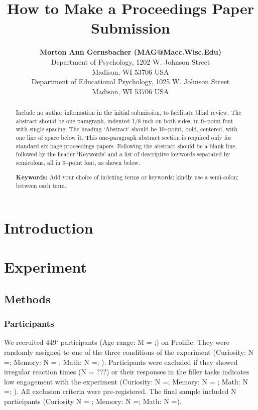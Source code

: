 \documentclass[10pt, letterpaper]{article}
\title{How to Make a Proceedings Paper Submission}
\author{{\large \bf Morton Ann Gernsbacher (MAG@Macc.Wisc.Edu)} \\ Department of Psychology, 1202 W. Johnson Street \\ Madison, WI 53706 USA \AND {\large \bf Sharon J.~Derry (SDJ@Macc.Wisc.Edu)} \\ Department of Educational Psychology, 1025 W. Johnson Street \\ Madison, WI 53706 USA}
\begin{document}
\maketitle

\begin{abstract}
Include no author information in the initial submission, to facilitate
blind review. The abstract should be one paragraph, indented 1/8 inch on
both sides, in 9\textasciitilde point font with single spacing. The
heading `Abstract' should be 10\textasciitilde point, bold, centered,
with one line of space below it. This one-paragraph abstract section is
required only for standard six page proceedings papers. Following the
abstract should be a blank line, followed by the header `Keywords' and a
list of descriptive keywords separated by semicolons, all in
9\textasciitilde point font, as shown below.

\textbf{Keywords:}
Add your choice of indexing terms or keywords; kindly use a semi-colon;
between each term.
\end{abstract}

\hypertarget{introduction}{%
\section{Introduction}\label{introduction}}

\hypertarget{experiment}{%
\section{Experiment}\label{experiment}}

\hypertarget{methods}{%
\subsection{Methods}\label{methods}}

\hypertarget{participants}{%
\subsubsection{Participants}\label{participants}}

We recruited 449` participants (Age range: M = ;) on Prolific. They were
randomly assigned to one of the three conditions of the experiment
(Curiosity: N =; Memory: N = ; Math: N =; ). Participants were excluded
if they showed irregular reaction times (N = ???) or their responses in
the filler tasks indicates low engagement with the experiment
(Curiosity: N =; Memory: N = ; Math: N =; ). All exclusion criteria were
pre-registered. The final sample included N participants (Curiosity N =
; Memory: N =; Math: N =).
\end{document}
